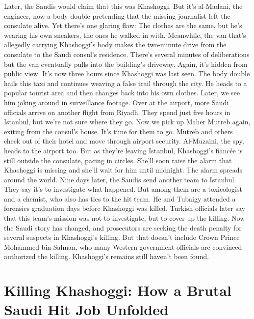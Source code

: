 \begin{itemize}
  Later, the Saudis would claim that this was Khashoggi. But it's
  al-Madani, the engineer, now a body double pretending that the missing
  journalist left the consulate alive. Yet there's one glaring flaw: The
  clothes are the same, but he's wearing his own sneakers, the ones he
  walked in with. Meanwhile, the van that's allegedly carrying
  Khashoggi's body makes the two-minute drive from the consulate to the
  Saudi consul's residence. There's several minutes of deliberations but
  the van eventually pulls into the building's driveway. Again, it's
  hidden from public view. It's now three hours since Khashoggi was last
  seen. The body double hails this taxi and continues weaving a false
  trail through the city. He heads to a popular tourist area and then
  changes back into his own clothes. Later, we see him joking around in
  surveillance footage. Over at the airport, more Saudi officials arrive
  on another flight from Riyadh. They spend just five hours in Istanbul,
  but we're not sure where they go. Now we pick up Maher Mutreb again,
  exiting from the consul's house. It's time for them to go. Mutreb and
  others check out of their hotel and move through airport security.
  Al-Muzaini, the spy, heads to the airport too. But as they're leaving
  Istanbul, Khashoggi's fiancée is still outside the consulate, pacing
  in circles. She'll soon raise the alarm that Khashoggi is missing and
  she'll wait for him until midnight. The alarm spreads around the
  world. Nine days later, the Saudis send another team to Istanbul. They
  say it's to investigate what happened. But among them are a
  toxicologist and a chemist, who also has ties to the hit team. He and
  Tubaigy attended a forensics graduation days before Khashoggi was
  killed. Turkish officials later say that this team's mission was not
  to investigate, but to cover up the killing. Now the Saudi story has
  changed, and prosecutors are seeking the death penalty for several
  suspects in Khashoggi's killing. But that doesn't include Crown Prince
  Mohammed bin Salman, who many Western government officials are
  convinced authorized the killing. Khashoggi's remains still haven't
  been found.
\end{itemize}

\hypertarget{killing-khashoggi-how-a-brutal-saudi-hit-job-unfolded-1}{%
\section{Killing Khashoggi: How a Brutal Saudi Hit Job
Unfolded}\label{killing-khashoggi-how-a-brutal-saudi-hit-job-unfolded-1}}


